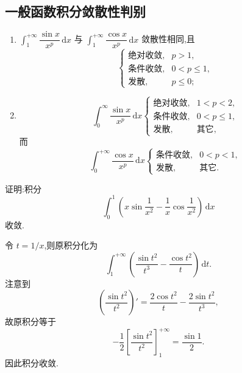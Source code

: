 \subsection{一般函数积分敛散性判别}

\begin{proposition}[\markstar]
  \begin{enumerate}
    \item $\displaystyle\int_1^{+\infty}\dfrac{\sin x}{x^p}\,\mathrm{d}x$ 与 $\displaystyle\int_1^{+\infty}\dfrac{\cos x}{x^p}\,\mathrm{d}x$ 敛散性相同,且
          \[
            \begin{cases}
              \text{绝对收敛}, & p>1,      \\
              \text{条件收敛}, & 0<p\leq1, \\
              \text{发散},   & p\leq0;
            \end{cases}
          \]
    \item
          \[
            \int_0^\infty\dfrac{\sin x}{x^p}\,\mathrm{d}x
            \begin{cases}
              \text{绝对收敛}, & 1<p<2,     \\
              \text{条件收敛}, & 0<p\leq1,  \\
              \text{发散},   & \text{其它},
            \end{cases}
          \]
          而
          \[
            \int_0^{+\infty}\dfrac{\cos x}{x^p}\,\mathrm{d}x
            \begin{cases}
              \text{条件收敛}, & 0<p<1,     \\
              \text{发散},   & \text{其它}.
            \end{cases}
          \]
  \end{enumerate}
\end{proposition}

\begin{example}
  证明:积分
  \[
    \int_0^1\left(x\sin\dfrac{1}{x^2}-\dfrac{1}{x}\cos\dfrac{1}{x^2}\right)\,\mathrm{d}x
  \]
  收敛.
\end{example}
\exampleblank

\begin{solution}
  令 $t=1/x$,则原积分化为
  \[
    \int_1^{+\infty}\left(\dfrac{\sin t^2}{t^3}-\dfrac{\cos t^2}{t}\right)\,\mathrm{d}t.
  \]
  注意到
  \[
    \left(\dfrac{\sin t^2}{t^2}\right)'
    =\dfrac{2\cos t^2}{t}-\dfrac{2\sin t^2}{t^3},
  \]
  故原积分等于
  \[
    -\dfrac{1}{2}\left[\dfrac{\sin t^2}{t^2}\right]_1^{+\infty}
    =\dfrac{\sin1}{2}.
  \]
  因此积分收敛.
\end{solution}

